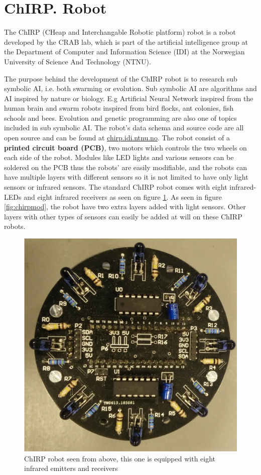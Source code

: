 \section{ChIRP. Robot}
\label{sec:chirp}
The ChIRP (CHeap and Interchangable Robotic platform) robot is a robot developed by the CRAB lab, which is part of the artificial intelligence group at the Department of Computer and Information Science (IDI) at the Norwegian University of Science And Technology (NTNU).

The purpose behind the development of the ChIRP robot is to research sub symbolic AI, i.e. both  swarming or evolution. Sub symbolic AI are algorithms and AI inspired by nature or biology. E.g Artificial Neural Network inspired from the human brain and swarm robots inspired from bird flocks, ant colonies, fish schools and bees. Evolution and genetic programming are also one of topics included in sub symbolic AI.
The robot's data schema and source code are all open source and can be found at \href{http://chirp.idi.ntnu.no}{chirp.idi.ntnu.no}. The robot consist of a \textbf{printed circuit board (PCB)}, two motors which controls the two wheels on each side of the robot.
Modules like LED lights and various sensors can be soldered on the PCB thus the robots' are easily modifiable, and the robots can have multiple layers with different sensors so it is not limited to have only light sensors or infrared sensors. The standard ChIRP robot comes with eight infrared-LEDs and eight infrared receivers as seen on figure \ref{fig:chirpAbove}. As seen in figure \ref{fig:chirpmod}, the robot have two extra layers added with light sensors. Other layers with other types of sensors can easily be added at will on these ChIRP robots.
\begin{figure}[H]
\centering
\includegraphics[width=0.8\linewidth]{images/chirpAbove.jpg}
\caption[ChIRP robot seen from above]{ChIRP robot seen from above, this one is equipped with eight infrared emitters and receivers}
\label{fig:chirpAbove}
\end{figure}
